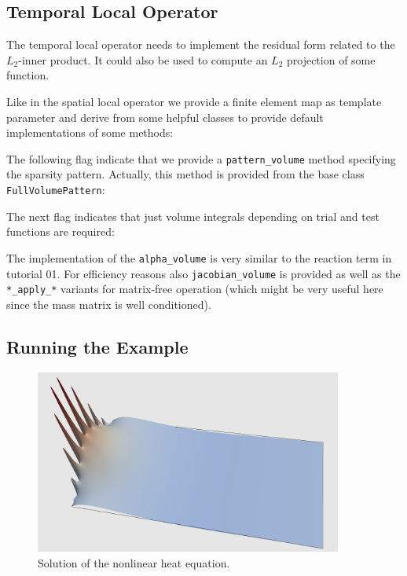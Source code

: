\documentclass[a4paper,12pt]{article}
\begin{document}
\subsection{Temporal Local Operator}

The temporal local operator needs to implement the
residual form related to the $L_2$-inner product. It could also 
be used to compute an $L_2$ projection of some function.

Like in the spatial local operator we provide a finite element
map as template parameter and derive from some helpful
classes to provide default implementations of some methods:


The following flag indicate that we provide a \lstinline{pattern_volume} method
specifying the sparsity pattern. Actually, this method is provided from the base class
\lstinline{FullVolumePattern}:


The next flag indicates that just volume integrals depending
on trial and test functions are required:


The implementation of the \lstinline{alpha_volume} 
is very similar to the reaction term in tutorial 01. For efficiency reasons
also \lstinline{jacobian_volume} is provided as well as the
\lstinline{*_apply_*} variants for matrix-free operation (which might
be very useful here since the mass matrix is well conditioned).

\subsection{Running the Example}

\begin{figure}
\begin{center}
\includegraphics[width=0.9\textwidth]{warp}
\end{center}
\caption{Solution of the nonlinear heat equation.}
\label{fig:Bunt}
\end{figure}
\end{document}

